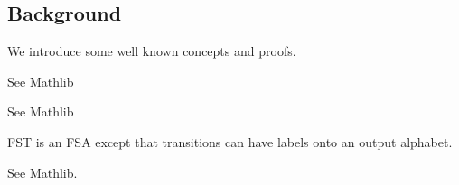 \subsection{Background}
We introduce some well known concepts and proofs.
\begin{definition}
    \label{def:FSA}
    See Mathlib
\end{definition}

\begin{definition}
    \label{def:RE}
    See Mathlib
\end{definition}

\begin{definition}
    \label{def:FST}
    FST is an FSA except that transitions can have labels onto an output alphabet.
\end{definition}

\begin{definition}
    \label{def:CFG}
    See Mathlib. 
\end{definition}


